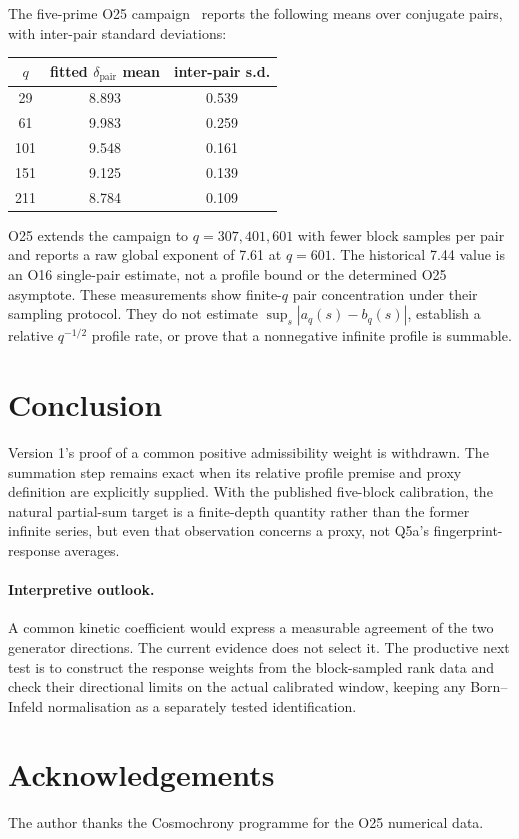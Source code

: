 \documentclass[12pt]{article}
\theoremstyle{definition}
\theoremstyle{remark}
\begin{document}
  The five-prime O25 campaign~\cite{Beau2026a29} reports the following
  means over conjugate pairs, with inter-pair standard deviations:
  \begin{center}
    \begin{tabular}{ccc}
      \hline
      $q$ & fitted $\delta_{\mathrm{pair}}$ mean & inter-pair s.d. \\
      \hline
      29  & 8.893 & 0.539 \\
      61  & 9.983 & 0.259 \\
      101 & 9.548 & 0.161 \\
      151 & 9.125 & 0.139 \\
      211 & 8.784 & 0.109 \\
      \hline
    \end{tabular}
  \end{center}
  O25 extends the campaign to $q=307,401,601$ with fewer block samples
  per pair and reports a raw global exponent of 7.61 at $q=601$.
  The historical 7.44 value is an O16 single-pair estimate, not a
  profile bound or the determined O25 asymptote.
  These measurements show finite-$q$ pair concentration under their
  sampling protocol.
  They do not estimate $\sup_s|a_q(s)-b_q(s)|$, establish a relative
  $q^{-1/2}$ profile rate, or prove that a nonnegative infinite profile
  is summable.

  \section{Conclusion}

  Version 1's proof of a common positive admissibility weight is
  withdrawn.
  The summation step remains exact when its relative profile premise
  and proxy definition are explicitly supplied.
  With the published five-block calibration, the natural partial-sum
  target is a finite-depth quantity rather than the former infinite
  series, but even that observation concerns a proxy, not Q5a's
  fingerprint-response averages.

  \paragraph{Interpretive outlook.}
  A common kinetic coefficient would express a measurable agreement of
  the two generator directions.
  The current evidence does not select it.
  The productive next test is to construct the response weights from
  the block-sampled rank data and check their directional limits on the
  actual calibrated window, keeping any Born--Infeld normalisation as
  a separately tested identification.

  \section*{Acknowledgements}

  The author thanks the Cosmochrony programme for the O25 numerical data.

  
  
\end{document}
